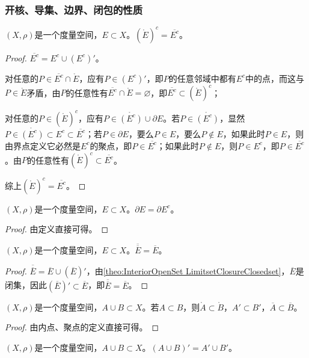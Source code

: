\subsubsection{开核、导集、边界、闭包的性质}
\begin{theorem}
	$(X,\rho)$是一个度量空间，$E\subset X$。$(\mathring{E})^c=\overline{E^c}$。
\end{theorem}
\begin{proof}
	$\overline{E^c}=E^c\cup (E^c)'$。\par
	对任意的$ P\in\overline{E^c}\cap\mathring{E}$，应有$P\in(E^c)'$，即$P$的任意邻域中都有$E^c$中的点，而这与$P\in\mathring{E}$矛盾，由$P$的任意性有$\overline{E^c}\cap\mathring{E}=\varnothing$，即$\overline{E^c}\subset(\mathring{E})^c$；\par
	对任意的$ P\in(\mathring{E})^c$，应有$P\in\mathring{(E^c)}\cup\partial E$。若$P\in\mathring{(E^c)}$，显然$P\in\mathring{(E^c)}\subset E^c\subset\overline{E^c}$；若$P\in\partial E$，要么$P\in E$，要么$P\notin E$，如果此时$P\in E$，则由界点定义它必然是$E^c$的聚点，即$P\in \overline{E^c}$；如果此时$P\notin E$，则$P\in E^c$，即$P\in \overline{E^c}$。由$P$的任意性有$(\mathring{E})^c\subset\overline{E^c}$。\par
	综上$(\mathring{E})^c=\overline{E^c}$。
\end{proof}
\begin{theorem}
	$(X,\rho)$是一个度量空间，$E\subset X$。$\partial E = \partial E^c$。
\end{theorem}
\begin{proof}
	由定义直接可得。
\end{proof}
\begin{theorem}
	$(X,\rho)$是一个度量空间，$E\subset X$。$\overline{\overline E}=\overline{E}$。
\end{theorem}
\begin{proof}
	$\overline{\overline E}=\overline{E}\cup (\overline{E})'$，由\cref{theo:InteriorOpenSet LimitsetClosureClosedset}，$\overline{E}$是闭集，因此$(\overline{E})'\subset\overline{E}$，即$\overline{\overline E}=\overline{E}$。
\end{proof}
\begin{theorem}\label{theo:subsetilc}
	$(X,\rho)$是一个度量空间，$A\cup B\subset X$。若$A\subset B$，则$\mathring{A}\subset\mathring{B}$，$A'\subset B'$，$\overline{A}\subset\overline{B}$。
\end{theorem}
\begin{proof}
	由内点、聚点的定义直接可得。
\end{proof}
\begin{theorem}\label{theo:cuplimitset eq2 limitsetcup}
	$(X,\rho)$是一个度量空间，$A\cup B\subset X$。$(A\cup B)'=A'\cup B'$。
\end{theorem}
